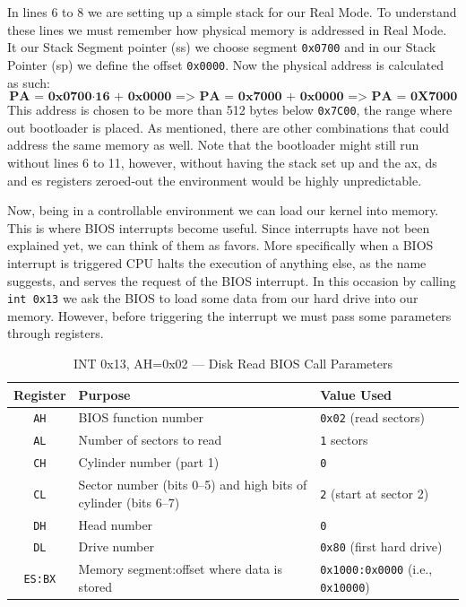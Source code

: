 In lines 6 to 8 we are setting up a simple stack for our Real Mode. To understand these lines we must
remember how physical memory is addressed in Real Mode. It our Stack Segment pointer (ss) we choose segment \texttt{0x0700}
and in our Stack Pointer (sp) we define the offset \texttt{0x0000}. Now the physical address is calculated as such:
\[
\textbf{PA = 0x0700} \cdot \textbf{16 + 0x0000}
\textbf{ => PA = 0x7000 + 0x0000}
\textbf{    => PA = 0X7000}
\]
This address is chosen to be more than 512 bytes below \texttt{0x7C00}, the range where out bootloader is placed.
As mentioned, there are other combinations that could address the same memory as well.
Note that the bootloader might still run without lines 6 to 11, however, without having the stack set up
and the ax, ds and es registers zeroed-out the environment would be highly unpredictable.


Now, being in a controllable environment we can load our kernel into memory. This is where BIOS interrupts become useful.
Since interrupts have not been explained yet, we can think of them as favors. More specifically when a BIOS interrupt is triggered 
CPU halts the execution of anything else, as the name suggests, and serves the request of the BIOS interrupt. In this occasion by 
calling \texttt{int 0x13} we ask the BIOS to load some data from our hard drive into our memory. However, before triggering 
the interrupt we must pass some parameters through registers.

\begin{table}[h]
    \centering
    \begin{tabular}{|c|p{5cm}|p{4cm}|}
    \hline
    \textbf{Register} & \textbf{Purpose} & \textbf{Value Used} \\ \hline
    \texttt{AH} & BIOS function number & \texttt{0x02} (read sectors) \\ \hline
    \texttt{AL} & Number of sectors to read & \texttt{1} sectors \\ \hline
    \texttt{CH} & Cylinder number (part 1) & \texttt{0} \\ \hline
    \texttt{CL} & Sector number (bits 0–5) and high bits of cylinder (bits 6–7) & \texttt{2} (start at sector 2) \\ \hline
    \texttt{DH} & Head number & \texttt{0} \\ \hline
    \texttt{DL} & Drive number & \texttt{0x80} (first hard drive) \\ \hline
    \texttt{ES:BX} & Memory segment:offset where data is stored & \texttt{0x1000:0x0000} (i.e., \texttt{0x10000}) \\ \hline
    \end{tabular}
    \caption{INT 0x13, AH=0x02 — Disk Read BIOS Call Parameters}
    \label{tab:disk_read_params}
\end{table}
    
